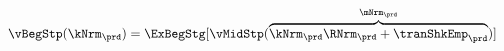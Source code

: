   \begin{equation}\begin{gathered}\begin{aligned}
        \vBegStp(\kNrm_{\prd}) & = \ExBegStg[\vMidStp(\overbrace{\kNrm_{\prd} \RNrm_{\prd} + \tranShkEmp_{\prd}}^{\mNrm_{\prd}})]  \label{eq:vBegStp}
      \end{aligned}\end{gathered}\end{equation}
